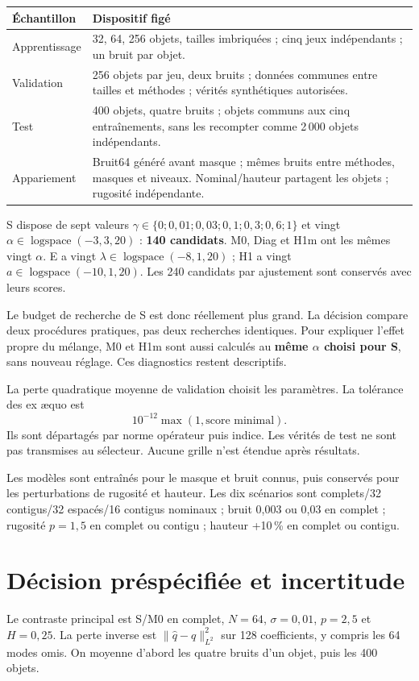 \documentclass[11pt,a4paper]{article}
\begin{document}
\begin{center}
\begin{tabular}{lp{10cm}}
\toprule Échantillon & Dispositif figé\\\midrule
Apprentissage & 32, 64, 256 objets, tailles imbriquées ; cinq jeux indépendants ; un bruit par objet.\\
Validation & 256 objets par jeu, deux bruits ; données communes entre tailles et méthodes ; vérités synthétiques autorisées.\\
Test & 400 objets, quatre bruits ; objets communs aux cinq entraînements, sans les recompter comme 2\,000 objets indépendants.\\
Appariement & Bruit64 généré avant masque ; mêmes bruits entre méthodes, masques et niveaux. Nominal/hauteur partagent les objets ; rugosité indépendante.\\\bottomrule
\end{tabular}
\end{center}

S dispose de sept valeurs $\gamma\in\{0;0,01;0,03;0,1;0,3;0,6;1\}$ et vingt $\alpha\in\operatorname{logspace}(-3,3,20)$ : \textbf{140 candidats}. M0, Diag et H1m ont les mêmes vingt $\alpha$. E a vingt $\lambda\in\operatorname{logspace}(-8,1,20)$ ; H1 a vingt $a\in\operatorname{logspace}(-10,1,20)$. Les 240 candidats par ajustement sont conservés avec leurs scores.

Le budget de recherche de S est donc réellement plus grand. La décision compare deux procédures pratiques, pas deux recherches identiques. Pour expliquer l'effet propre du mélange, M0 et H1m sont aussi calculés au \textbf{même $\alpha$ choisi pour S}, sans nouveau réglage. Ces diagnostics restent descriptifs.

La perte quadratique moyenne de validation choisit les paramètres. La tolérance des ex æquo est\[10^{-12}\max(1,\text{score minimal}).\]Ils sont départagés par norme opérateur puis indice. Les vérités de test ne sont pas transmises au sélecteur. Aucune grille n'est étendue après résultats.

Les modèles sont entraînés pour le masque et bruit connus, puis conservés pour les perturbations de rugosité et hauteur. Les dix scénarios sont complets/32 contigus/32 espacés/16 contigus nominaux ; bruit 0,003 ou 0,03 en complet ; rugosité $p=1,5$ en complet ou contigu ; hauteur +10\,\% en complet ou contigu.

\newpage
\section{Décision préspécifiée et incertitude}
Le contraste principal est S/M0 en complet, $N=64$, $\sigma=0,01$, $p=2,5$ et $H=0,25$. La perte inverse est $\|\widehat q-q\|_{L^2}^2$ sur 128 coefficients, y compris les 64 modes omis. On moyenne d'abord les quatre bruits d'un objet, puis les 400 objets.
\end{document}
